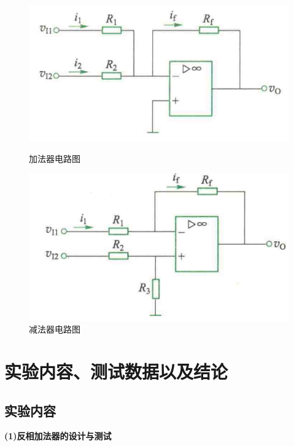 \documentclass[10pt, a4paper]{article} %
\begin{document}
\begin{figure}[htbp]
    
    \centering
    \begin{minipage}
{0.45\textwidth}
        \centering
        \includegraphics[width=1.0\textwidth]{image/1.png}
        \caption{加法器电路图}
        \label{fig:加法器电路图}
    \end{minipage}
    \hfill
    \begin{minipage}
{0.45\textwidth}
        \centering
        \includegraphics[width=1.0\textwidth]{image/2.png}
        \caption{减法器电路图}
        \label{fig:减法器电路图}
    \end{minipage}
\end{figure}

\section{实验内容、测试数据以及结论}

\subsection{实验内容}
\textbf{(1)反相加法器的设计与测试}
\end{document}
